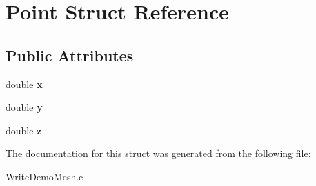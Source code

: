 \hypertarget{struct_point}{
\section{Point Struct Reference}
\label{struct_point}
}
\subsection*{Public Attributes}
\begin{DoxyCompactItemize}
\item 
\hypertarget{struct_point_ab99c56589bc8ad5fa5071387110a5bc7}{
double {\bfseries x}}
\label{struct_point_ab99c56589bc8ad5fa5071387110a5bc7}

\item 
\hypertarget{struct_point_afa38be143ae800e6ad69ce8ed4df62d8}{
double {\bfseries y}}
\label{struct_point_afa38be143ae800e6ad69ce8ed4df62d8}

\item 
\hypertarget{struct_point_a05ba3b1dfcb19430582ae953cbbfbded}{
double {\bfseries z}}
\label{struct_point_a05ba3b1dfcb19430582ae953cbbfbded}

\end{DoxyCompactItemize}


The documentation for this struct was generated from the following file:\begin{DoxyCompactItemize}
\item 
WriteDemoMesh.c\end{DoxyCompactItemize}
